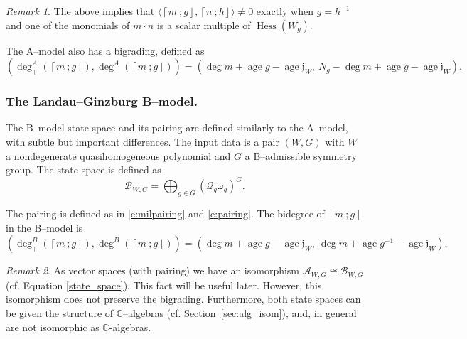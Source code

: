 \documentclass[10pt, letterpaper]{amsart}
\theoremstyle{remark}
\newtheorem{rem}{Remark}[thm]
\newcommand{\CC}{\mathbb C}
\newcommand{\sA}{\mathscr{A}}
\newcommand{\sB}{\mathscr{B}}
\newcommand{\sQ}{\mathscr{Q}}
\newcommand{\fjrw}[2]{ \left\lceil #1 \:; #2 \right\rfloor }
\newcommand{\jw}{\mathfrak{j}}
\DeclareMathOperator{\Hess}{Hess}
\DeclareMathOperator{\age}{age}
\begin{document}
\begin{rem}\label{pairing:conditions}
The above implies that  $\langle\fjrw{m}{g},\fjrw{n}{h} \rangle \neq 0$ exactly when $g = h^{-1}$ and one of the monomials of $m\cdot n$ is a scalar multiple of $\Hess(W_g)$.  
\end{rem}


The A--model also has a bigrading, defined as
\begin{equation}\label{e:fjrwbidegree}
(\deg^A_+(\fjrw{m}{g}), \deg^A_-(\fjrw{m}{g})) = \left(\deg m+\age g-\age\jw_W,\ N_g-\deg m+\age g-\age\jw_W\right).
\end{equation}

\subsubsection*{The Landau--Ginzburg B--model.}
The B--model state space and its pairing are defined similarly to the A--model, with subtle but important differences. 
The input data is a pair $(W, G)$ with $W$ a nondegenerate quasihomogeneous polynomial and $G$ a B--admissible symmetry group. The state space is defined as 
\begin{equation}\label{e:Bstatespace}
\sB_{W,G} = \bigoplus_{g \in G} \left(\sQ_g \omega_g \right)^G.
\end{equation}

The pairing is defined as in \eqref{e:milpairing} and \eqref{e:pairing}. The bidegree of $\fjrw{m}{g}$ in the B--model is 
\[
(\deg^B_+(\fjrw{m}{g}), \deg^B_-(\fjrw{m}{g})) = \left(\deg m+\age g-\age\jw_W,\ \deg m+\age g^{-1}-\age\jw_W\right).
\] 

\begin{rem}\label{r:ABiso}
As vector spaces (with pairing) we have an isomorphism $\sA_{W,G}\cong \sB_{W,G}$ (cf. Equation \ref{state_space}). This fact will be useful later. However, this isomorphism does not preserve the bigrading. Furthermore, both state spaces can be given the structure of $\CC$--algebras (cf. Section~\ref{sec:alg_isom}), and, in general are not isomorphic as $\CC$-algebras. 
\end{rem}
\end{document}
